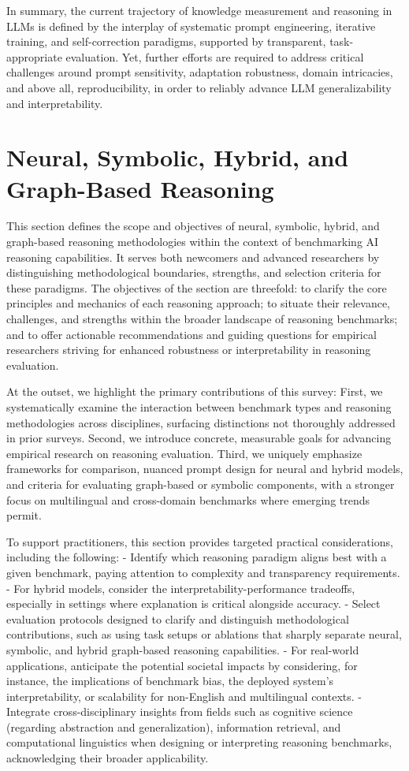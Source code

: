 \documentclass[sigconf]{acmart}
\begin{document}
In summary, the current trajectory of knowledge measurement and reasoning in LLMs is defined by the interplay of systematic prompt engineering, iterative training, and self-correction paradigms, supported by transparent, task-appropriate evaluation. Yet, further efforts are required to address critical challenges around prompt sensitivity, adaptation robustness, domain intricacies, and above all, reproducibility, in order to reliably advance LLM generalizability and interpretability.

\section{Neural, Symbolic, Hybrid, and Graph-Based Reasoning}

This section defines the scope and objectives of neural, symbolic, hybrid, and graph-based reasoning methodologies within the context of benchmarking AI reasoning capabilities. It serves both newcomers and advanced researchers by distinguishing methodological boundaries, strengths, and selection criteria for these paradigms. The objectives of the section are threefold: to clarify the core principles and mechanics of each reasoning approach; to situate their relevance, challenges, and strengths within the broader landscape of reasoning benchmarks; and to offer actionable recommendations and guiding questions for empirical researchers striving for enhanced robustness or interpretability in reasoning evaluation.

At the outset, we highlight the primary contributions of this survey: First, we systematically examine the interaction between benchmark types and reasoning methodologies across disciplines, surfacing distinctions not thoroughly addressed in prior surveys. Second, we introduce concrete, measurable goals for advancing empirical research on reasoning evaluation. Third, we uniquely emphasize frameworks for comparison, nuanced prompt design for neural and hybrid models, and criteria for evaluating graph-based or symbolic components, with a stronger focus on multilingual and cross-domain benchmarks where emerging trends permit.

To support practitioners, this section provides targeted practical considerations, including the following:
- Identify which reasoning paradigm aligns best with a given benchmark, paying attention to complexity and transparency requirements. 
- For hybrid models, consider the interpretability-performance tradeoffs, especially in settings where explanation is critical alongside accuracy.
- Select evaluation protocols designed to clarify and distinguish methodological contributions, such as using task setups or ablations that sharply separate neural, symbolic, and hybrid graph-based reasoning capabilities.
- For real-world applications, anticipate the potential societal impacts by considering, for instance, the implications of benchmark bias, the deployed system’s interpretability, or scalability for non-English and multilingual contexts.
- Integrate cross-disciplinary insights from fields such as cognitive science (regarding abstraction and generalization), information retrieval, and computational linguistics when designing or interpreting reasoning benchmarks, acknowledging their broader applicability.
\end{document}
